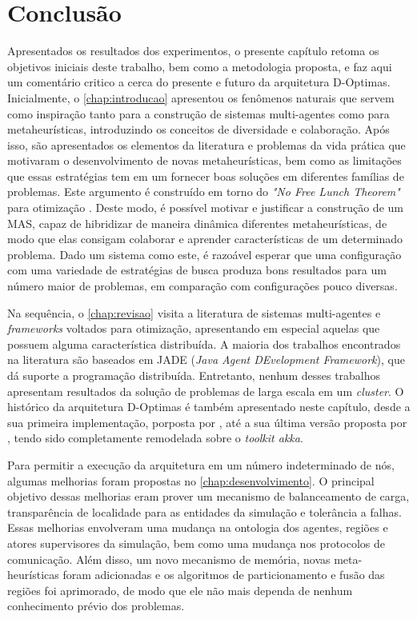 \chapter{Conclusão}
\label{chap:conclusao}

Apresentados os resultados dos experimentos, o presente capítulo retoma os objetivos iniciais deste trabalho, bem como a metodologia proposta, e faz aqui um comentário critico a cerca do presente e futuro da arquitetura D-Optimas. Inicialmente, o \autoref{chap:introducao} apresentou os fenômenos naturais que servem como inspiração tanto para a construção de sistemas multi-agentes como para metaheurísticas, introduzindo os conceitos de diversidade e colaboração. Após isso, são apresentados os elementos da literatura e problemas da vida prática que motivaram o desenvolvimento de novas metaheurísticas, bem como as limitações que essas estratégias tem em um fornecer boas soluções em diferentes famílias de problemas. Este argumento é construído em torno do \textit{"No Free Lunch Theorem"} para otimização \cite{wolpert1997}. Deste modo, é possível motivar e justificar a construção de um MAS, capaz de hibridizar de maneira dinâmica diferentes  metaheurísticas, de modo que elas consigam colaborar e aprender características de um determinado problema. Dado um sistema como este, é razoável esperar que uma configuração com uma variedade de estratégias de busca produza bons resultados para um número maior de problemas, em comparação com configurações pouco diversas. 

Na sequência, o \autoref{chap:revisao} visita a literatura de sistemas multi-agentes e \textit{frameworks} voltados para otimização, apresentando em especial aquelas que  possuem alguma característica distribuída. A maioria dos trabalhos encontrados na literatura são baseados em JADE (\textit{Java Agent DEvelopment Framework}), que dá suporte a programação distribuída. Entretanto, nenhum desses trabalhos apresentam resultados da solução de problemas de larga escala em um \textit{cluster}. O histórico da arquitetura D-Optimas é também apresentado neste capítulo, desde a sua primeira implementação, porposta por , até a sua última versão proposta por , tendo sido completamente remodelada sobre o \textit{toolkit akka}.

Para permitir a execução da arquitetura em um número indeterminado de nós, algumas melhorias foram propostas no \autoref{chap:desenvolvimento}. O principal objetivo dessas melhorias eram prover um mecanismo de balanceamento de carga, transparência de localidade para as entidades da simulação e tolerância a falhas. Essas melhorias envolveram uma mudança na ontologia dos agentes, regiões e atores supervisores da simulação, bem como uma mudança nos protocolos de comunicação. Além disso, um novo mecanismo de memória, novas meta-heurísticas foram adicionadas e os algoritmos de particionamento e fusão das regiões foi aprimorado, de modo que ele não mais dependa de nenhum conhecimento prévio dos problemas.

